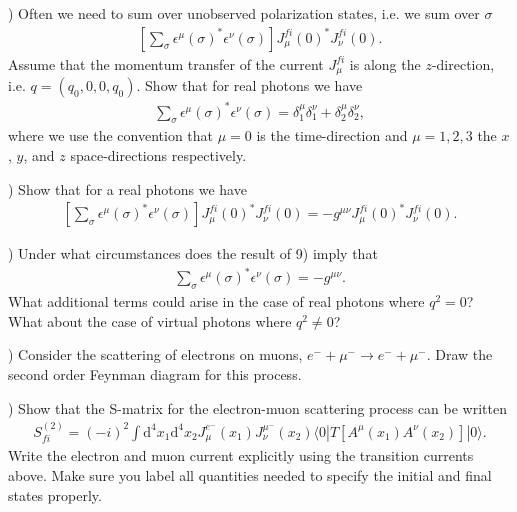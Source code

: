 \documentclass[working, oneside]{../../../Preambles/tuftebook}
\begin{document}
\vspace{1em}
) Often we need to sum over unobserved polarization states, i.e. we sum over $\sigma$
\begin{align}
\left[\sum_\sigma\epsilon^{\mu}(\sigma)^*\epsilon^{\nu}(\sigma)\right]
J_{\mu}^{fi}(0)^*J_{\nu}^{fi}(0).
\end{align}
Assume that the momentum transfer of the current $J_{\mu}^{fi}$ is along the $z$-direction, i.e.
$q=(q_0,0,0,q_0)$. Show that for real photons we have 
\begin{align}
\sum_\sigma\epsilon^{\mu}(\sigma)^*\epsilon^{\nu}(\sigma)=\delta^{\mu}_{1}\delta^{\nu}_{1}+\delta^{\mu}_{2}\delta^{\nu}_{2},
\end{align}
where we use the convention that $\mu=0$ is the time-direction and $\mu=1,2,3$ the $x$, $y$, and $z$ space-directions
respectively.

\vspace{1em}
) Show that for a real photons we have 
\begin{align}
\left[\sum_\sigma\epsilon^{\mu}(\sigma)^*\epsilon^{\nu}(\sigma)\right]
J_{\mu}^{fi}(0)^*J_{\nu}^{fi}(0)=-g^{\mu\nu}J_{\mu}^{fi}(0)^*J_{\nu}^{fi}(0).
\end{align}

\vspace{1em}
) Under what circumstances does the result of 9) imply that 
\begin{align}
\sum_\sigma\epsilon^{\mu}(\sigma)^*\epsilon^{\nu}(\sigma)=-g^{\mu\nu}.
\end{align}
What additional terms could arise in the case of real photons where $q^2=0$? 
What about the case of virtual photons where $q^2\neq 0$?

\vspace{1em}
) Consider the scattering of electrons on muons, $e^-+\mu^-\to e^-+\mu^-$. Draw the 
second order Feynman diagram for this process.

\vspace{1em}
) Show that the S-matrix for the electron-muon scattering process
can be written 
\begin{align}
S_{fi}^{(2)}=(-i)^2\int \textrm{d}^4x_1\textrm{d}^4x_2 
J_{\mu}^{e^-}(x_1)J_{\nu}^{\mu^-}(x_2) \langle 0 | T\left[A^{\mu}(x_1)A^{\nu}(x_2) \right] |0\rangle.
\end{align}
Write the electron and muon current explicitly using the transition currents above. Make sure you 
label all quantities needed to specify the initial and final states properly.
\end{document}
